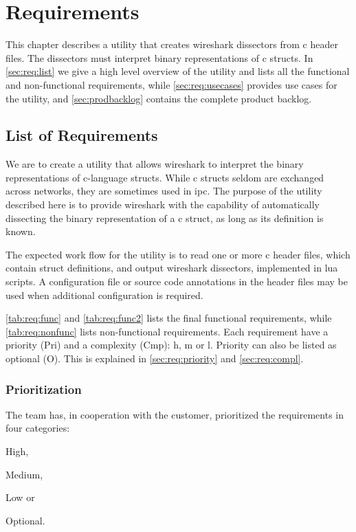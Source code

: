 \chapter{Requirements}
\label{chap:req:requirements}
This chapter describes a \gls{utility} that creates \Gls{wireshark} \glspl{dissector} from \Gls{c}
\gls{header} files. The \glspl{dissector} must interpret \gls{binary} representations of \Gls{c}
\glspl{struct}. In \autoref{sec:req:list} we give a high level overview of the
\gls{utility} and lists all the functional and non-functional requirements, 
while \autoref{sec:req:usecases} provides use cases for the \gls{utility}, 
and \autoref{sec:prodbacklog} contains the complete product backlog.

\section{List of Requirements}
\label{sec:req:list}
We are to create a \gls{utility} that allows \Gls{wireshark} to interpret the \gls{binary}
representations of \Gls{c}-language \glspl{struct}. While \Gls{c} \glspl{struct} seldom are exchanged
across networks, they are sometimes used in \gls{ipc}. The
purpose of the \gls{utility} described here is to provide \Gls{wireshark} with the
capability of automatically dissecting the \gls{binary} representation of a \Gls{c} \gls{struct},
as long as its definition is known.

The expected work flow for the \gls{utility} is to read one or more \Gls{c} \gls{header} files,
which contain \gls{struct} definitions, and output \Gls{wireshark} \glspl{dissector}, implemented
in \Gls{lua} scripts. A configuration file or source code annotations in the \gls{header}
files may be used when additional configuration is required.

\autoref{tab:req:func} and \autoref{tab:req:func2} lists the final functional requirements,
while \autoref{tab:req:nonfunc} lists non-functional requirements.
Each requirement have a priority (Pri) and a complexity (Cmp): \Gls{h}, 
\Gls{m} or \Gls{l}. Priority can also be listed as optional (O). This is
explained in \autoref{sec:req:priority} and \autoref{sec:req:compl}.

\subsection{Prioritization}
\label{sec:req:priority}
The team has, in cooperation with the customer, prioritized the requirements
in four categories:
\begin{inparaenum}
	\item High,
	\item Medium,
	\item Low or
	\item Optional.
\end{inparaenum} 

